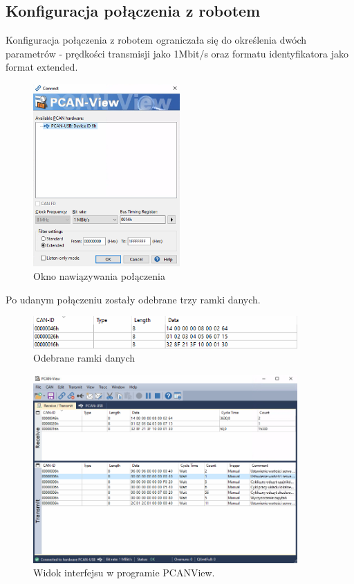 \documentclass[margin = 2cm]{article}
\begin{document}
	\subsection{Konfiguracja połączenia z robotem}
Konfiguracja połączenia z robotem ograniczała się do określenia dwóch parametrów - prędkości transmisji jako 1Mbit/s oraz formatu identyfikatora jako format extended.
		\begin{figure}[H]
			\centering
			\includegraphics[width=0.5\textwidth]{0}
			\caption{Okno nawiązywania połączenia}
		\end{figure}
Po udanym połączeniu zostały odebrane trzy ramki danych.
		\begin{figure}[H]
			\centering
			\includegraphics[width=0.9\textwidth]{0_1}
			\caption{Odebrane ramki danych}
		\end{figure}
		\begin{figure}[H]
			\centering
			\includegraphics[width=0.9\textwidth]{interfejs}
			\caption{Widok interfejsu w programie PCANView.}
		\end{figure}
\end{document}
